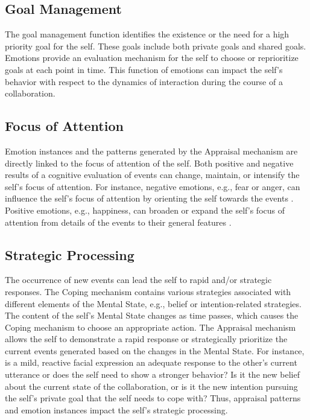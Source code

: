 \documentclass[12pt]{report}
\begin{document}
\subsection{Goal Management} The goal management function identifies the
existence or the need for a high priority goal for the self. These goals
include both private goals and shared goals. Emotions provide an evaluation
mechanism for the self to choose or reprioritize goals at each point in time.
This function of emotions can impact the self's behavior with respect to the
dynamics of interaction during the course of a collaboration.

\subsection{Focus of Attention} Emotion instances and the patterns generated
by the Appraisal mechanism are directly linked to the focus of attention of the
self. Both positive and negative results of a cognitive evaluation of events can
change, maintain, or intensify the self's focus of attention. For instance,
negative emotions, e.g., fear or anger, can influence the self's focus of
attention by orienting the self towards the events
\cite{faucher:fear-attention}. Positive emotions, e.g., happiness, can broaden
or expand the self's focus of attention from details of the events to their
general features \cite{fredrickson:positive-emotion-attention}.

\subsection{Strategic Processing} The occurrence of new events can lead the
self to rapid and/or strategic responses. The Coping mechanism contains various
strategies associated with different elements of the Mental State, e.g.,
belief or intention-related strategies. The content of the self's Mental State
changes as time passes, which causes the Coping mechanism to choose an
appropriate action. The Appraisal mechanism allows the self to demonstrate a
rapid response or strategically prioritize the current events generated
based on the changes in the Mental State. For instance, is a mild, reactive
facial expression an adequate response to the other's current utterance or does
the self need to show a stronger behavior? Is it the new belief about the
current state of the collaboration, or is it the new intention pursuing the
self's private goal that the self needs to cope with? Thus, appraisal patterns
and emotion instances impact the self's strategic processing.
\end{document}
